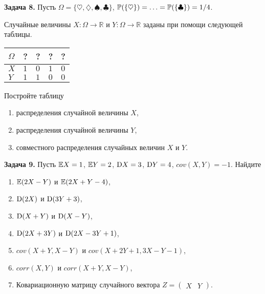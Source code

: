 \textbf{Задача 8.} Пусть $\Omega =\{ \heartsuit ,\diamondsuit ,\spadesuit ,\clubsuit \} $, ${\rm {\mathbb P}}(\{ \heartsuit \} )=\ldots ={\rm {\mathbb P}}(\{ \clubsuit \} )=1/4$.

Случайные величины $X:\Omega \to {\mathbb R}$ и $Y:\Omega \to {\mathbb R}$ заданы при помощи следующей таблицы.

\begin{tabular}{|p{0.3in}|p{0.3in}|p{0.3in}|p{0.3in}|p{0.3in}|} \hline 
$\Omega $ & ? & ? & ? & ? \\ \hline 
$X$ & $1$ & $0$ & $1$ & $0$ \\ \hline 
$Y$ & $1$ & $1$ & $0$ & $0$ \\ \hline 
\end{tabular}

Постройте таблицу 

\begin{enumerate}
\item  распределения случайной величины $X$,

\item  распределения случайной величины $Y$,

\item  совместного распределения случайных величин $X$ и $Y$.
\end{enumerate}

\textbf{Задача 9.} Пусть ${\rm {\mathbb E}}X=1$, ${\rm {\mathbb E}}Y=2$, ${\rm D}X=3$, ${\rm D}Y=4$, $cov(X,Y)=-1$. Найдите

\begin{enumerate}
\item  ${\rm {\mathbb E}}(2X-Y)$ и ${\rm {\mathbb E}}(2X+Y-4)$,

\item  ${\rm D}(2X)$ и ${\rm D}(3Y+3)$,

\item  ${\rm D}(X+Y)$ и ${\rm D}(X-Y)$,

\item  ${\rm D}(2X+3Y)$ и ${\rm D}(2X-3Y+1)$,

\item  $cov(X+Y,X-Y)$ и $cov(X+2Y+1,3X-Y-1)$,

\item  $corr(X,Y)$ и $corr(X+Y,X-Y)$,

\item  Ковариационную матрицу случайного вектора $Z=(\begin{array}{cc} {X} & {Y} \end{array})$.
\end{enumerate}

